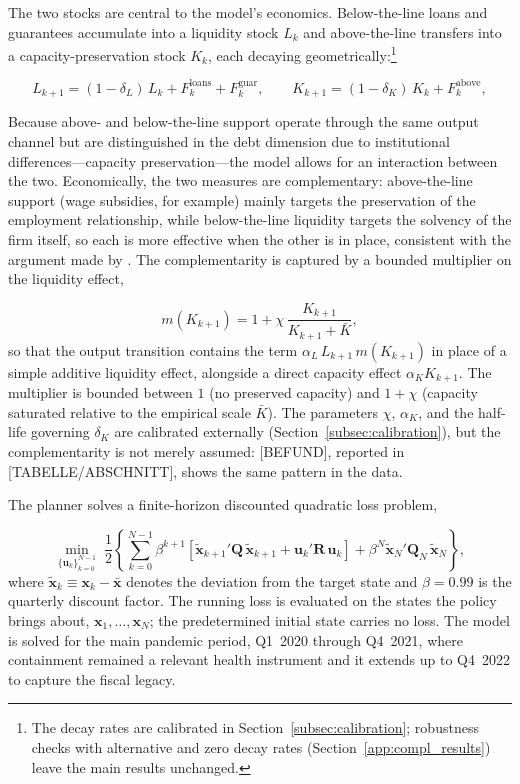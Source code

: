 \documentclass[12pt, a4paper]{article}
\begin{document}
The two stocks are central to the model's economics. Below-the-line loans and guarantees
accumulate into a liquidity stock \(L_k\) and above-the-line transfers into a
capacity-preservation stock \(K_k\), each decaying geometrically:\footnote{The decay rates are calibrated in Section~\ref{subsec:calibration}; robustness checks with alternative and zero decay rates (Section~\ref{app:compl_results}) leave the main results unchanged.} 

\begin{equation}
  L_{k+1} = (1-\delta_L)\,L_k + F^{\text{loans}}_k + F^{\text{guar}}_k,
  \qquad
  K_{k+1} = (1-\delta_K)\,K_k + F^{\text{above}}_k,
  \label{eq:stocks}
\end{equation}

Because above- and below-the-line support operate through the same output channel but are distinguished in the debt dimension due to institutional differences---capacity
preservation---the model allows for an interaction between the two. Economically, the two
measures are complementary: above-the-line support (wage subsidies, for example) mainly
targets the preservation of the employment relationship, while below-the-line liquidity
targets the solvency of the firm itself, so each is more effective when the other is in
place, consistent with the argument made by \citet{QUELLE_ANGEBEN}. The complementarity is
captured by a bounded multiplier on the liquidity effect,

\begin{equation}
  m(K_{k+1}) = 1 + \chi\,\frac{K_{k+1}}{K_{k+1} + \bar K},
  \label{eq:complementarity}
\end{equation}
so that the output transition contains the term \(\alpha_L\, L_{k+1}\, m(K_{k+1})\) in
place of a simple additive liquidity effect, alongside a direct capacity effect
\(\alpha_K K_{k+1}\). The multiplier is bounded between \(1\) (no preserved capacity) and
\(1+\chi\) (capacity saturated relative to the empirical scale \(\bar K\)). The parameters
\(\chi\), \(\alpha_K\), and the half-life governing \(\delta_K\) are calibrated externally
(Section~\ref{subsec:calibration}), but the complementarity is not merely assumed:
[BEFUND], reported in [TABELLE/ABSCHNITT], shows the same pattern in the data.

The planner solves a finite-horizon discounted quadratic loss problem,

\begin{equation}
  \min_{\{\bm{u}_k\}_{k=0}^{N-1}}\;
  \frac{1}{2}\left\{
  \sum_{k=0}^{N-1} \beta^{k+1}
  \left[\tilde{\bm{x}}_{k+1}' \bm{Q}\, \tilde{\bm{x}}_{k+1}
  + \bm{u}_k' \bm{R}\, \bm{u}_k\right]
  + \beta^N \tilde{\bm{x}}_N' \bm{Q}_N\, \tilde{\bm{x}}_N
  \right\},
  \label{eq:objective}
\end{equation}
where \(\tilde{\bm{x}}_k \equiv \bm{x}_k - \bar{\bm{x}}\) denotes the deviation from the
target state and \(\beta = 0.99\) is the quarterly discount factor. The running loss is
evaluated on the states the policy brings about, \(\bm{x}_1, \ldots, \bm{x}_N\); the
predetermined initial state carries no loss. The model is solved for the main pandemic period, Q1~2020 through Q4~2021, where containment remained a relevant health instrument and it extends up to Q4~2022 to capture the fiscal legacy.
\end{document}
